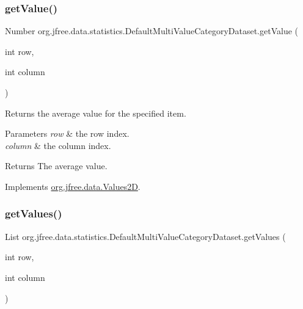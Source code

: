 \subsubsection{\texorpdfstring{get\+Value()}{getValue()}\hspace{0.1cm}{\footnotesize\ttfamily [2/2]}}
{\footnotesize\ttfamily Number org.\+jfree.\+data.\+statistics.\+Default\+Multi\+Value\+Category\+Dataset.\+get\+Value (\begin{DoxyParamCaption}\item[{int}]{row,  }\item[{int}]{column }\end{DoxyParamCaption})}

Returns the average value for the specified item.


\begin{DoxyParams}{Parameters}
{\em row} & the row index. \\
\hline
{\em column} & the column index.\\
\hline
\end{DoxyParams}
\begin{DoxyReturn}{Returns}
The average value. 
\end{DoxyReturn}


Implements \mbox{\hyperlink{interfaceorg_1_1jfree_1_1data_1_1_values2_d_a0797937d3ac62e18b300eef1fe906ec6}{org.\+jfree.\+data.\+Values2D}}.

\mbox{\label{classorg_1_1jfree_1_1data_1_1statistics_1_1_default_multi_value_category_dataset_af4ab5f0a4363c4e57bbf17921326bc3e}} 
\subsubsection{\texorpdfstring{get\+Values()}{getValues()}\hspace{0.1cm}{\footnotesize\ttfamily [1/2]}}
{\footnotesize\ttfamily List org.\+jfree.\+data.\+statistics.\+Default\+Multi\+Value\+Category\+Dataset.\+get\+Values (\begin{DoxyParamCaption}\item[{int}]{row,  }\item[{int}]{column }\end{DoxyParamCaption})}


